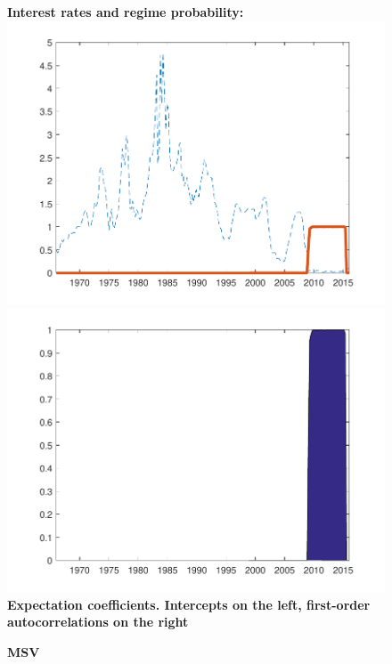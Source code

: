 \documentclass[12pt,reqno]{article}
\numberwithin{equation}{section}
\begin{document}
\begin{figure}[H]
\caption{\large{\textbf{MSV}}}
\vspace{5 mm}

\textbf{Interest rates and regime probability:} \\

\includegraphics[scale=0.6]{NKPC_ree_init_MSV_regime.pdf}
\includegraphics[scale=0.6]{NKPC_ree_init_MSV_regimeProb.pdf}\\

\textbf{Expectation coefficients. Intercepts on the left, first-order autocorrelations on the right}\\


\end{figure}
\end{document}
